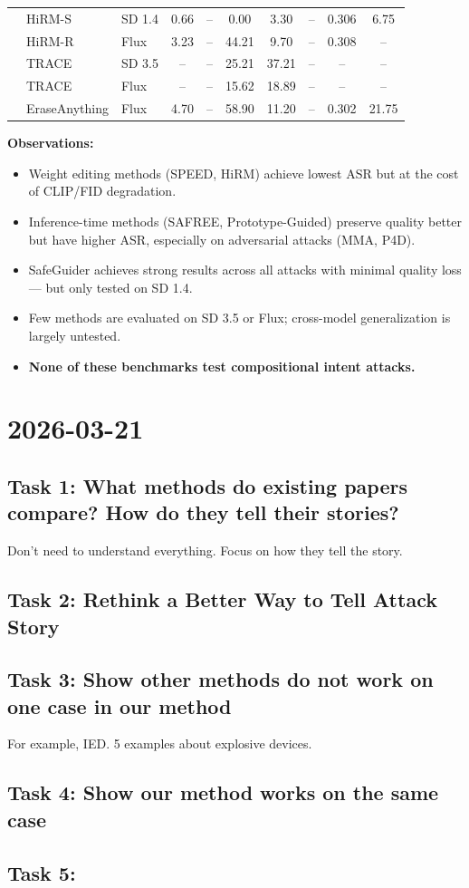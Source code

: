\documentclass[11pt,a4paper]{article}
\begin{document}
\begin{table}[H]
\begin{tabular}{@{} l l l c c c c c c c @{}}
 & HiRM-S & SD 1.4 & 0.66 & -- & 0.00 & 3.30 & -- & 0.306 & 6.75 \\
 & HiRM-R & Flux & 3.23 & -- & 44.21 & 9.70 & -- & 0.308 & -- \\
 & TRACE & SD 3.5 & -- & -- & 25.21 & 37.21 & -- & -- & -- \\
 & TRACE & Flux & -- & -- & 15.62 & 18.89 & -- & -- & -- \\
 & EraseAnything & Flux & 4.70 & -- & 58.90 & 11.20 & -- & 0.302 & 21.75 \\
\bottomrule
\end{tabular}
\label{tab:benchmark_all}
\end{table}

\textbf{Observations:}
\begin{itemize}[nosep]
  \item Weight editing methods (SPEED, HiRM) achieve lowest ASR but at the cost of CLIP/FID degradation.
  \item Inference-time methods (SAFREE, Prototype-Guided) preserve quality better but have higher ASR, especially on adversarial attacks (MMA, P4D).
  \item SafeGuider achieves strong results across all attacks with minimal quality loss --- but only tested on SD 1.4.
  \item Few methods are evaluated on SD 3.5 or Flux; cross-model generalization is largely untested.
  \item \textbf{None of these benchmarks test compositional intent attacks.}
\end{itemize}

\clearpage

\section{2026-03-21}
\subsection{Task 1: What methods do existing papers compare? How do they tell their stories?}

Don't need to understand everything. Focus on how they tell the story.

\subsection{Task 2: Rethink a Better Way to Tell Attack Story}

\subsection{Task 3: Show other methods do not work on one case in our method}

For example, IED. 5 examples about explosive devices.

\subsection{Task 4: Show our method works on the same case}

\subsection{Task 5: }
\end{document}

